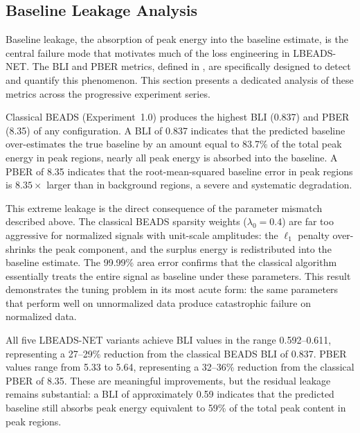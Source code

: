 \subsection{Baseline Leakage Analysis}
\label{sec:results_leakage}

Baseline leakage, the absorption of peak energy into the baseline estimate, is the central failure mode that motivates much of the loss engineering in LBEADS-NET. The BLI and PBER metrics, defined in , are specifically designed to detect and quantify this phenomenon. This section presents a dedicated analysis of these metrics across the progressive experiment series.


Classical BEADS (Experiment~1.0) produces the highest BLI (0.837) and PBER (8.35) of any configuration. A BLI of 0.837 indicates that the predicted baseline over-estimates the true baseline by an amount equal to 83.7\% of the total peak energy in peak regions, nearly all peak energy is absorbed into the baseline. A PBER of 8.35 indicates that the root-mean-squared baseline error in peak regions is $8.35\times$ larger than in background regions, a severe and systematic degradation.

This extreme leakage is the direct consequence of the parameter mismatch described above. The classical BEADS sparsity weights ($\lambda_0 = 0.4$) are far too aggressive for normalized signals with unit-scale amplitudes: the $\ell_1$ penalty over-shrinks the peak component, and the surplus energy is redistributed into the baseline estimate. The 99.99\% area error confirms that the classical algorithm essentially treats the entire signal as baseline under these parameters. This result demonstrates the tuning problem in its most acute form: the same parameters that perform well on unnormalized data produce catastrophic failure on normalized data.


All five LBEADS-NET variants achieve BLI values in the range 0.592--0.611, representing a 27--29\% reduction from the classical BEADS BLI of 0.837. PBER values range from 5.33 to 5.64, representing a 32--36\% reduction from the classical PBER of 8.35. These are meaningful improvements, but the residual leakage remains substantial: a BLI of approximately 0.59 indicates that the predicted baseline still absorbs peak energy equivalent to 59\% of the total peak content in peak regions.

